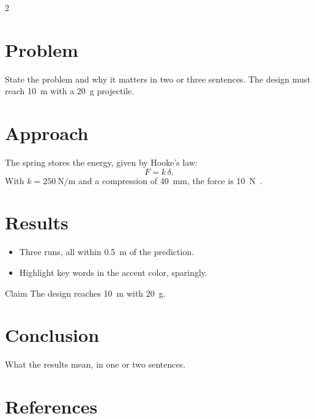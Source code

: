 \documentclass[a4paper, 10pt]{article}
\begin{document}
\maketitle

\begin{multicols}{2}
  \section{Problem}
  State the problem and why it matters in two or three sentences.
  The design must reach \SI{10}{\metre} with a \SI{20}{\gram} projectile.

  \section{Approach}
  The spring stores the energy, given by Hooke's law:
  \begin{equation*}
    F = k \, \delta .
  \end{equation*}
  With $k = \SI{250}{\newton\per\metre}$ and a compression of \SI{40}{\milli\metre}, the force is \SI{10}{\newton}~\cite{knuth1986}.


  \columnbreak
  \section{Results}
  \begin{itemize}
    \item Three runs, all within \SI{0.5}{\metre} of the prediction.
    \item \textcolor{Tue-accent}{Highlight} key words in the accent color, sparingly.
  \end{itemize}

  \begin{block}{Claim}
    The design reaches \SI{10}{\metre} with \SI{20}{\gram}.
  \end{block}

  \section{Conclusion}
  What the results mean, in one or two sentences.

  \section{References}
  {\footnotesize\printbibliography[heading=none]}
\end{multicols}
\end{document}

